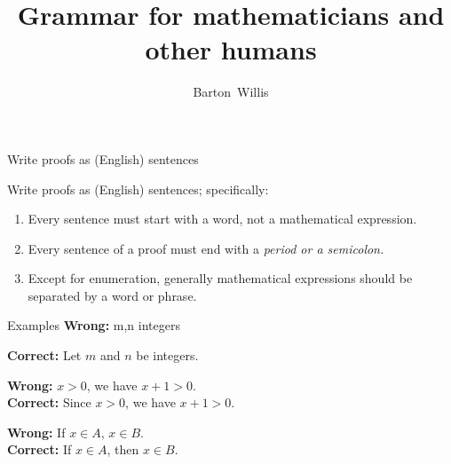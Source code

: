 \documentclass[professionalfonts]{beamer}%
\title[Proofs for humans] %
{Grammar for mathematicians and other humans}
\author[Barton Willis] %
{Barton~Willis}
\institute[UNK] %
{
  MATH 460 \\
   \medskip
  Department of Mathematics and Statistics\\
  University Nebraska at Kearney
  }
\date{}
\newenvironment{handlist}{
  \begin{enumerate}[\leftthumbsup]
    \addtolength{\itemsep}{-0.3\itemsep}}
  {\end{enumerate}}
\begin{document}
\frame{\titlepage}


\begin{frame}[fragile]{Write proofs as (English) sentences}{}%

Write proofs as (English) sentences; specifically:

\begin{handlist}
\item Every sentence must start with a word, not  a mathematical expression.
\item Every sentence of a proof must  end with a \emph{period or a semicolon.}
\item Except for  enumeration, generally mathematical expressions should be separated by  a word or phrase. 
\end{handlist}

\vfill 
\end{frame}
\begin{frame}[fragile]{}{}%

\vspace{0.1in}

\begin{block}{Examples}
\textbf{Wrong:} m,n integers

\textbf{Correct:} Let \(m\) and \(n\) be integers.\\

\vspace{0.1in}

\textbf{Wrong:} \(x > 0\),  we have \(x + 1 > 0\).\\
\textbf{Correct:}  Since \(x > 0\), we have \(x + 1 > 0\).

\vspace{0.1in}

\textbf{Wrong:} If \(x \in A\), \(x \in B\).\\
\textbf{Correct:}  If \(x \in A\), then  \(x \in B\).
\end{block}

\vfill
\end{frame} 
\end{document}
